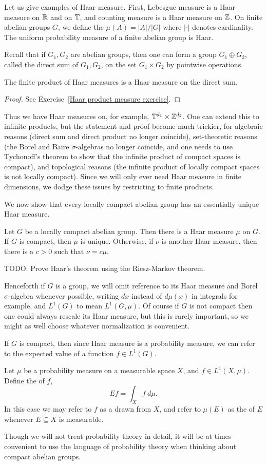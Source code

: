 Let us give examples of Haar measure.
First, Lebesgue measure is a Haar measure on $\mathbb{R}$ and on $\mathbb{T}$, and counting measure is a Haar measure on $\mathbb{Z}$.
On finite abelian groups $G$, we define the  $\mu(A) = |A|/|G|$ where $|\cdot|$ denotes cardinality.
The uniform probability measure of a finite abelian group is Haar.

Recall that if $G_1, G_2$ are abelian groups, then one can form a group $G_1 \oplus G_2$, called the direct sum of $G_1,G_2$, on the set $G_1 \times G_2$ by pointwise operations.
\begin{lemma}\label{Haar product measure}
The finite product of Haar measures is a Haar measure on the direct sum.
\end{lemma}
\begin{proof}
See Exercise~\ref{Haar product measure exercise}.
\end{proof}
Thus we have Haar measures on, for example, $\mathbb{T}^{d_1} \times \mathbb{Z}^{d_2}$.
One can extend this to infinite products, but the statement and proof become much trickier, for algebraic reasons (direct sum and direct product no longer coincide), set-theoretic reasons (the Borel and Baire $\sigma$-algebras no longer coincide, and one needs to use Tychonoff's theorem to show that the infinite product of compact spaces is compact), and topological reasons (the infinite product of locally compact spaces is not locally compact).
Since we will only ever need Haar measure in finite dimensions, we dodge these issues by restricting to finite products.

We now show that every locally compact abelian group has an essentially unique Haar measure.
\begin{theorem}
Let $G$ be a locally compact abelian group.
Then there is a Haar measure $\mu$ on $G$.
If $G$ is compact, then $\mu$ is unique.
Otherwise, if $\nu$ is another Haar measure, then there is a $c > 0$ such that $\nu = c\mu$.
\end{theorem}
TODO: Prove Haar's theorem using the Riesz-Markov theorem.

Henceforth if $G$ is a group, we will omit reference to its Haar measure and Borel $\sigma$-algebra whenever possible, writing $dx$ instead of $d\mu(x)$ in integrals for example, and $L^1(G)$ to mean $L^1(G, \mu)$.
Of course if $G$ is not compact then one could always rescale its Haar measure, but this is rarely important, so we might as well choose whatever normalization is convenient.

If $G$ is compact, then since Haar measure is a probability measure, we can refer to the expected value of a function $f \in L^1(G)$.
\begin{definition}
Let $\mu$ be a probability measure on a measurable space $X$, and $f \in L^1(X, \mu)$.
Define the  of $f$,
\[Ef = \int_{X} f~d\mu.\]
In this case we may refer to $f$ as a  drawn from $X$, and refer to $\mu(E)$ as the  of $E$ whenever $E \subseteq X$ is measurable.
\end{definition}
Though we will not treat probability theory in detail, it will be at times convenient to use the language of probability theory when thinking about compact abelian groups.


